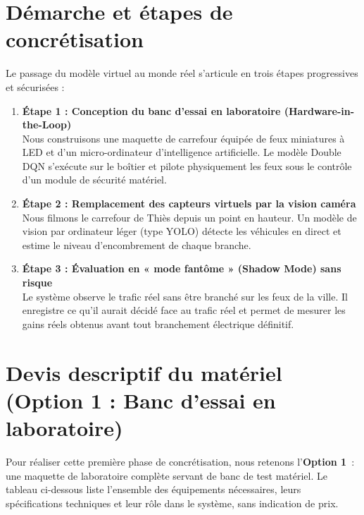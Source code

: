 \documentclass[11pt,a4paper]{article}
\begin{document}
\section{Démarche et étapes de concrétisation}

Le passage du modèle virtuel au monde réel s'articule en trois étapes progressives et sécurisées :

\begin{enumerate}
    \item \textbf{Étape 1 : Conception du banc d'essai en laboratoire (Hardware-in-the-Loop)} \\
    Nous construisons une maquette de carrefour équipée de feux miniatures à LED et d'un micro-ordinateur d'intelligence artificielle. Le modèle Double DQN s'exécute sur le boîtier et pilote physiquement les feux sous le contrôle d'un module de sécurité matériel.
    
    \item \textbf{Étape 2 : Remplacement des capteurs virtuels par la vision caméra} \\
    Nous filmons le carrefour de Thiès depuis un point en hauteur. Un modèle de vision par ordinateur léger (type YOLO) détecte les véhicules en direct et estime le niveau d'encombrement de chaque branche.
    
    \item \textbf{Étape 3 : Évaluation en « mode fantôme » (Shadow Mode) sans risque} \\
    Le système observe le trafic réel sans être branché sur les feux de la ville. Il enregistre ce qu'il aurait décidé face au trafic réel et permet de mesurer les gains réels obtenus avant tout branchement électrique définitif.
\end{enumerate}

\section{Devis descriptif du matériel (Option 1 : Banc d'essai en laboratoire)}

Pour réaliser cette première phase de concrétisation, nous retenons l'\textbf{Option 1}~: une maquette de laboratoire complète servant de banc de test matériel. Le tableau ci-dessous liste l'ensemble des équipements nécessaires, leurs spécifications techniques et leur rôle dans le système, sans indication de prix.

\vspace{0.2cm}
\end{document}
